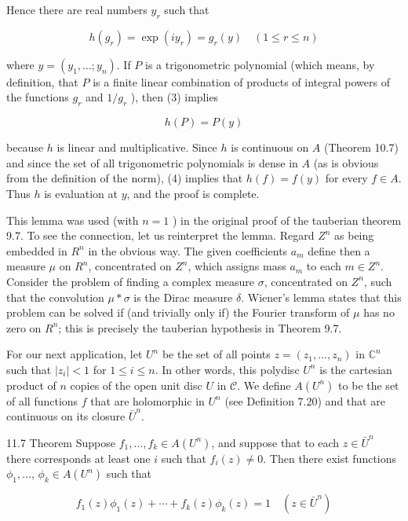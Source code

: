 \documentclass[10pt]{article}
\begin{document}
Hence there are real numbers $y_{r}$ such that

$$
h\left(g_{r}\right)=\exp \left(i y_{r}\right)=g_{r}(y) \quad(1 \leq r \leq n)
$$

where $y=\left(y_{1}, \ldots ; y_{n}\right)$. If $P$ is a trigonometric polynomial (which means, by
definition, that $P$ is a finite linear combination of products of integral powers of the functions $g_{r}$ and $1 / g_{r}$ ), then (3) implies

$$
h(P)=P(y)
$$

because $h$ is linear and multiplicative. Since $h$ is continuous on $A$ (Theorem 10.7) and since the set of all trigonometric polynomials is dense in $A$ (as is obvious from the definition of the norm), (4) implies that $h(f)=f(y)$ for every $f \in A$. Thus $h$ is evaluation at $y$, and the proof is complete.

This lemma was used (with $n=1$ ) in the original proof of the tauberian theorem 9.7. To see the connection, let us reinterpret the lemma. Regard $Z^{n}$ as being embedded in $R^{n}$ in the obvious way. The given coefficients $a_{m}$ define then a measure $\mu$ on $R^{n}$, concentrated on $Z^{n}$, which assigns mass $a_{m}$ to each $m \in Z^{n}$. Consider the problem of finding a complex measure $\sigma$, concentrated on $Z^{n}$, such that the convolution $\mu * \sigma$ is the Dirac measure $\delta$. Wiener's lemma states that this problem can be solved if (and trivially only if) the Fourier transform of $\mu$ has no zero on $R^{n}$; this is precisely the tauberian hypothesis in Theorem 9.7.

For our next application, let $U^{n}$ be the set of all points $z=\left(z_{1}, \ldots, z_{n}\right)$ in $\mathbb{C}^{n}$ such that $\left|z_{i}\right|<1$ for $1 \leq i \leq n$. In other words, this polydisc $U^{n}$ is the cartesian product of $n$ copies of the open unit disc $U$ in $\mathscr{C}$. We define $A\left(U^{n}\right)$ to be the set of all functions $f$ that are holomorphic in $U^{n}$ (see Definition 7.20) and that are continuous on its closure $\bar{U}^{n}$.

11.7 Theorem Suppose $f_{1}, \ldots, f_{k} \in A\left(U^{n}\right)$, and suppose that to each $z \in \bar{U}^{n}$ there corresponds at least one $i$ such that $f_{i}(z) \neq 0$. Then there exist functions $\phi_{1}, \ldots$, $\phi_{k} \in A\left(U^{n}\right)$ such that

$$
f_{1}(z) \phi_{1}(z)+\cdots+f_{k}(z) \phi_{k}(z)=1 \quad\left(z \in \bar{U}^{n}\right)
$$
\end{document}
